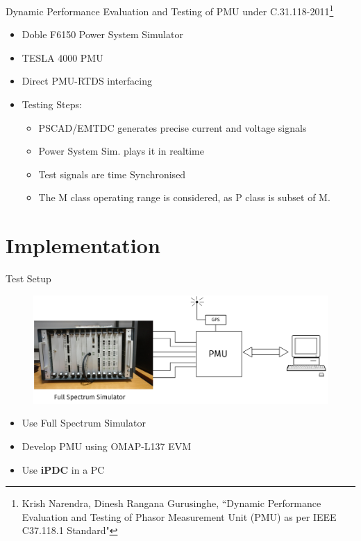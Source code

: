 \documentclass{beamer}
\begin{document}
\begin{frame}{{Dynamic Performance Evaluation and Testing of PMU under C.31.118-2011}\footnote{\tiny Krish Narendra, Dinesh Rangana Gurusinghe, ``Dynamic Performance Evaluation and Testing of Phasor Measurement Unit (PMU) as per IEEE C37.118.1 Standard"}}
\begin{itemize}
\item Doble F6150 Power System Simulator
\item TESLA 4000 PMU
\item Direct PMU-RTDS interfacing
\item Testing Steps:
\begin{itemize}
	\item PSCAD/EMTDC generates precise current and voltage signals
	\item Power System Sim. plays it in realtime
	\item Test signals are time Synchronised
	\item The M class operating range is considered, as P class is subset of M. 
\end{itemize}
\end{itemize}
\end{frame}

\section{Implementation}
\begin{frame}{Test Setup}
\begin{figure}
\includegraphics[width=\textwidth]{Test_setup.png}
\end{figure}
\begin{itemize}
\item Use Full Spectrum Simulator 
\item Develop PMU using OMAP-L137 EVM
\item Use \textbf{iPDC} in a PC
\end{itemize}
\end{frame}
\end{document}
